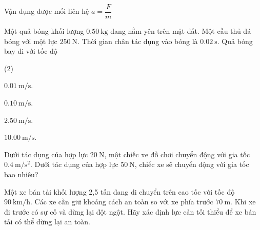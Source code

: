 \begin{dang}{Vận dụng được mối liên hệ $a=\dfrac{F}{m}$}
	{Một quả bóng khối lượng $\SI{0.50}{\kilogram}$ đang nằm yên trên mặt đất. Một cầu thủ đá bóng với một lực $\SI{250}{\newton}$. Thời gian chân tác dụng vào bóng là $\SI{0.02}{\second}$. Quả bóng bay đi với tốc độ
		\begin{mcq}(2)
			\item $\SI{0.01}{\meter/\second}$.
			\item $\SI{0.10}{\meter/\second}$.
			\item $\SI{2.50}{\meter/\second}$.
			\item $\SI{10.00}{\meter/\second}$.
		\end{mcq}
	
}
{}

{Dưới tác dụng của hợp lực $\SI{20}{\newton}$, một chiếc xe đồ chơi chuyển động với gia tốc $\SI{0.4}{\meter/\second^2}$. Dưới tác dụng của hợp lực $\SI{50}{\newton}$, chiếc xe sẽ chuyển động với gia tốc bao nhiêu?
}
{}

{Một xe bán tải khối lượng 2,5 tấn đang di chuyển trên cao tốc với tốc độ $\SI{90}{\kilo\meter/\hour}$. Các xe cần giữ khoảng cách an toàn so với xe phía trước $\SI{70}{\meter}$. Khi xe đi trước có sự cố và dừng lại đột ngột. Hãy xác định lực cản tối thiểu để xe bán tải có thể dừng lại an toàn.
}
{}
\end{dang}
